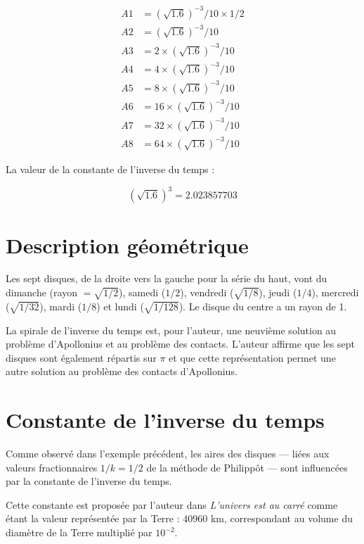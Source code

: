 \documentclass[11pt,a4paper]{article}
\begin{document}
\[
\begin{aligned}
A1 &= (\sqrt{1.6})^{-3}/10 \times 1/2 \\
A2 &= (\sqrt{1.6})^{-3}/10 \\
A3 &= 2 \times (\sqrt{1.6})^{-3}/10 \\
A4 &= 4 \times (\sqrt{1.6})^{-3}/10 \\
A5 &= 8 \times (\sqrt{1.6})^{-3}/10 \\
A6 &= 16 \times (\sqrt{1.6})^{-3}/10 \\
A7 &= 32 \times (\sqrt{1.6})^{-3}/10 \\
A8 &= 64 \times (\sqrt{1.6})^{-3}/10
\end{aligned}
\]



La valeur de la constante de l’inverse du temps :


\[
(\sqrt{1.6})^3 = 2.023857703
\]



\section{Description géométrique}

Les sept disques, de la droite vers la gauche pour la série du haut, vont du dimanche (rayon \(=\sqrt{1/2}\)), samedi (\(1/2\)), vendredi (\(\sqrt{1/8}\)), jeudi (\(1/4\)), mercredi (\(\sqrt{1/32}\)), mardi (\(1/8\)) et lundi (\(\sqrt{1/128}\)). Le disque du centre a un rayon de 1.

La spirale de l’inverse du temps est, pour l’auteur, une neuvième solution au problème d’Apollonius et au problème des contacts. L’auteur affirme que les sept disques sont également répartis sur \(\pi\) et que cette représentation permet une autre solution au problème des contacts d’Apollonius.

\section{Constante de l’inverse du temps}

Comme observé dans l’exemple précédent, les aires des disques — liées aux valeurs fractionnaires \(1/k = 1/2\) de la méthode de Philippôt — sont influencées par la constante de l’inverse du temps.

Cette constante est proposée par l’auteur dans \emph{L’univers est au carré} comme étant la valeur représentée par la Terre : \(40960\) km, correspondant au volume du diamètre de la Terre multiplié par \(10^{-2}\).
\end{document}
